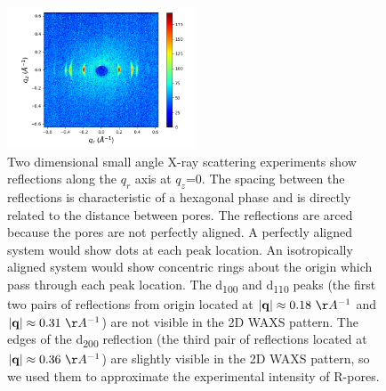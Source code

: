 \documentclass{article}
\begin{document}
  \begin{figure}[!htb]
  \centering
  \includegraphics[width=0.5\textwidth]{2DSAXS_axes.png}
  \caption{Two dimensional small angle X-ray scattering experiments show
  reflections along the $q_r$ axis at $q_z$=0. The spacing between the reflections
  is characteristic of a hexagonal phase and is directly related to the distance
  between pores. The reflections are arced because the pores are not perfectly
  aligned. A perfectly aligned system would show dots at each peak location. An
  isotropically aligned system would show concentric rings about the origin which
  pass through each peak location. The d\textsubscript{100} and d\textsubscript{110} 
  peaks (the first two pairs of reflections from origin located at $|\mathbf{q}| 
  \approx 0.18~\AA^{-1}$ and $|\mathbf{q}| \approx 0.31~\AA^{-1}$) are not visible
  in the 2D WAXS pattern. The edges of the d\textsubscript{200} reflection (the third
  pair of reflections located at $|\mathbf{q}| \approx 0.36~\AA^{-1}$) are slightly
  visible in the 2D WAXS pattern, so we used them to approximate the experimental
  intensity of R-pores.}\label{fig:2DSAXS}
  \end{figure}

\clearpage

\end{document}
